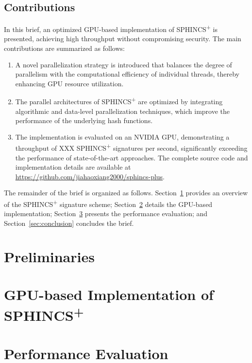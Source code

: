 \documentclass[journal]{IEEEtran}
\begin{document}
\subsection{Contributions}

In this brief, an optimized GPU-based implementation of SPHINCS\textsuperscript{+} is presented, achieving high throughput without compromising security. The main contributions are summarized as follows:

\begin{enumerate}
  \item A novel parallelization strategy is introduced that balances the degree of parallelism with the computational efficiency of individual threads, thereby enhancing GPU resource utilization.
  \item The parallel architectures of SPHINCS\textsuperscript{+} are optimized by integrating algorithmic and data-level parallelization techniques, which improve the performance of the underlying hash functions.
  \item The implementation is evaluated on an NVIDIA GPU, demonstrating a throughput of XXX SPHINCS\textsuperscript{+} signatures per second, significantly exceeding the performance of state-of-the-art approaches. The complete source code and implementation details are available at \url{https://github.com/jiahaoxiang2000/sphincs-plus}.
\end{enumerate}
The remainder of the brief is organized as follows. Section~\ref{sec:preliminaries} provides an overview of the SPHINCS\textsuperscript{+} signature scheme; Section~\ref{sec:implementation} details the GPU-based implementation; Section~\ref{sec:evaluation} presents the performance evaluation; and Section~\ref{sec:conclusion} concludes the brief.

\section{Preliminaries}\label{sec:preliminaries}

\section{GPU-based Implementation of \texorpdfstring{SPHINCS\textsuperscript{+}}{SPHINCS+}}\label{sec:implementation}

\section{Performance Evaluation}\label{sec:evaluation}
\end{document}
